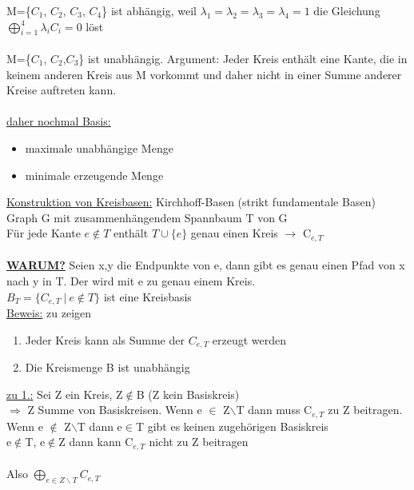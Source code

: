 M=\{$C_1$, $C_2$, $C_3$, $C_4$\} ist abhängig, weil $\lambda_1=\lambda_2=\lambda_3=\lambda_4=1$ die Gleichung\\
$\bigoplus\limits_{i=1}^{4} \lambda_i C_i=0$ löst
\\\\
M=\{$C_1$, $C_2$,$C_3$\} ist unabhängig. Argument: Jeder Kreis enthält eine Kante, die in keinem anderen Kreis aus M vorkommt und daher nicht in einer Summe anderer Kreise auftreten kann.
\\\\
\underline{daher nochmal Basis:}
\begin{itemize}
	\item maximale unabhängige Menge
	\item minimale erzeugende Menge
\end{itemize}

\underline{Konstruktion von Kreisbasen:} Kirchhoff-Basen (strikt fundamentale Basen)
\\
Graph G mit zusammenhängendem Spannbaum T von G\\
Für jede Kante $e\notin T$ enthält $T \cup \{e\}$ genau einen Kreis $\rightarrow$ C$_{e,T}$
\\\\
\underline{\textbf{WARUM?}} Seien x,y die Endpunkte von e, dann gibt es genau einen Pfad von x nach y in T. Der wird mit e zu genau einem Kreis.
\\
$B_T=\{C_{e,T}\ |\ e \not \in T\}$ ist eine Kreisbasis %
\\
\underline{Beweis:} zu zeigen
\begin{enumerate}
	\item Jeder Kreis kann als Summe der $C_{e,T}$ erzeugt werden
	\item Die Kreismenge B ist unabhängig
\end{enumerate}

\underline{zu 1.:} Sei Z ein Kreis, Z$\notin$B (Z kein Basiskreis)\\
$\Rightarrow$ Z Summe von Basiskreisen. Wenn e $\in$ Z$\backslash$T dann muss C$_{e,T}$ zu Z beitragen. Wenn e $\notin$ Z$\backslash$T dann e$\in$T gibt es keinen zugehörigen Basiskreis\\
e$\notin$T, e$\notin$Z dann kann C$_{e,T}$ nicht zu Z beitragen\\\\
Also $\bigoplus\limits_{e \in Z\backslash T} C_{e,T}$

